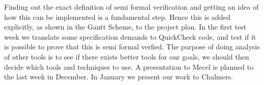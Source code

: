 \documentclass[11pt,a4paper]{report}
\begin{document}
Finding out the exact definition of semi formal verification and getting an idea of how this
can be implemented is a fundamental step. Hence this is added explicitly, as
shown in the Gantt Scheme, to the project plan.
In the first test week we translate some specification
demands to QuickCheck code, and test if it is possible to prove that this is
semi formal verfied. The purpose of doing analysis of other tools is to see if there exists better
tools for our goals, we should then decide which tools and techniques to use.
A presentation to Mecel is planned to the last week in December.  In January we
present our work to Chalmers.




\end{document}
